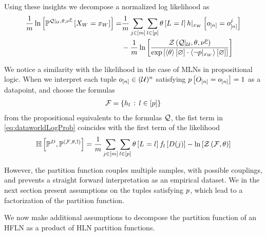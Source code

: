 Using these insights we decompose a normalized log likelihood as
\begin{align}
    \label{eq:dataworldLogProb}
    \frac{1}{m} \ln \left[ \mathbb{P}^{{\mathcal{Q}}|_{\mathcal{U}},\theta,\nu^{\underline{p}}}\left[X_{W}=x_{W}\right] \right]
    = & \frac{1}{m} \sum_{j\in[m]} \sum_{l\in[p]} \theta\left[L_{}=l_{}\right]
    {h}|_{x_{W}} \left[o_{[n]} = o_{[n]}^{j}\right] \\
    & - \frac{1}{m} \ln \left[ 
        \frac{\mathcal{Z}\left({\mathcal{Q}}|_{\mathcal{U}},\theta,\nu^{\underline{p}}\right)}{
            \mathrm{exp}\left[\left\langle \theta\right\rangle \left[ \varnothing \right] \cdot \left\langle {\lnot p}|_{x_{W}}\right\rangle \left[ \varnothing \right]\right]
        }
     \right]
\end{align}

We notice a similarity with the likelihood in the case of MLNs in propositional logic.
When we interpret each tuple $o_{[n]}\in(\mathcal{U})^{n}$ satisfying $p\left[O_{[n]}=o_{[n]}\right]=1$ as a datapoint, and choose the formulas
\begin{align*}
    \mathcal{F} = \{h_{l} \, : \, l\in[p] \}
\end{align*}
from the propositional equivalents to the formulas $\mathcal{Q}$, the fist term in \eqref{eq:dataworldLogProb} coincides with the first term of the likelihood
\begin{align*}
    \mathbb{H}\left[\mathbb{P}^{D},\mathbb{P}^{(\mathcal{F},\theta,\mathbb{I})}\right]
    = \frac{1}{m}\sum_{j\in[m]} \sum_{l\in[p]} \theta\left[L_{}=l_{}\right] f_{l}\left[D(j)\right] - \ln \left[ \mathcal{Z}\left(\mathcal{F},\theta\right) \right]
\end{align*}

However, the partition function couples multiple samples, with possible couplings, and prevents a straight forward interpretation as an empirical dataset.
We in the next section present assumptions on the tuples satisfying $p$, which lead to a factorization of the partition function.



We now make additional assumptions to decompose the partition function of an HFLN as a product of HLN partition functions.


